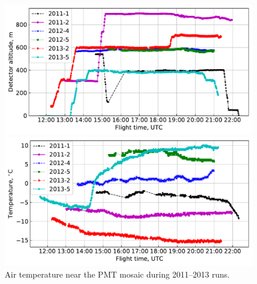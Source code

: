 \documentclass[universe,article,submit,moreauthors,pdftex]{Definitions/mdpi}
\begin{document}
\begin{paracol}{2}
\switchcolumn
\begin{figure}[tb]    
    \begin{minipage}[t]{0.48\textwidth}
        \centering
        \includegraphics[width=\textwidth]{Telemetry_height.pdf}
        \caption{Altitude of the SPHERE-2 detector carried by the BAPA tethered balloon according to the GPS module data during 2011--2013 flights.}
        \label{fig:height}
    \end{minipage}
    \hfill
    \begin{minipage}[t]{0.48\textwidth}
        \centering
        \includegraphics[width=\textwidth]{Telemetry_tmos.pdf}
        \caption{Air temperature near the PMT mosaic during 2011--2013 runs.}
        \label{fig:temperature}
    \end{minipage}
\end{figure}


\end{paracol}
\end{document}
